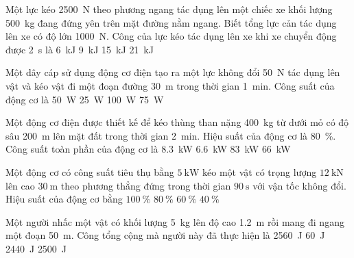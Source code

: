 \begin{ex}
	Một lực kéo \SI{2500}{\newton} theo phương ngang tác dụng lên một chiếc xe khối lượng \SI{500}{\kilogram} đang đứng yên trên mặt đường nằm ngang. Biết tổng lực cản tác dụng lên xe có độ lớn \SI{1000}{\newton}. Công của lực kéo tác dụng lên xe khi xe chuyển động được \SI{2}{\second} là 
	\choice
	{\SI{6}{\kilo\joule}}
	{\SI{9}{\kilo\joule}}
	{\True \SI{15}{\kilo\joule}}
	{\SI{21}{\kilo\joule}}
	\loigiai{}
\end{ex}
\begin{ex}
	Một dây cáp sử dụng động cơ điện tạo ra một lực không đổi \SI{50}{\newton} tác dụng lên vật và kéo vật đi một đoạn đường \SI{30}{\meter} trong thời gian \SI{1}{\minute}. Công suất của động cơ là
	\choice
	{\SI{50}{\watt}}
	{\True \SI{25}{\watt}}
	{\SI{100}{\watt}}
	{\SI{75}{\watt}}
	\loigiai{}
\end{ex}
\begin{ex}
	Một động cơ điện được thiết kế để kéo thùng than nặng \SI{400}{\kilogram} từ dưới mỏ có độ sâu \SI{200}{\meter} lên mặt đất trong thời gian \SI{2}{\minute}. Hiệu suất của động cơ là \SI{80}{\percent}. Công suất toàn phần của động cơ là
	\choice
	{\True \SI{8.3}{\kilo\watt}}
	{\SI{6.6}{\kilo\watt}}
	{\SI{83}{\kilo\watt}}
	{\SI{66}{\kilo\watt}}
	\loigiai{}
\end{ex}
\begin{ex}
	Một động cơ có công suất tiêu thụ bằng $\SI{5}{\kilo\watt}$ kéo một vật có trọng lượng $\SI{12}{\kilo\newton}$ lên cao $\SI{30}{\meter}$ theo phương thẳng đứng trong thời gian $\SI{90}{\second}$ với vận tốc không đổi. Hiệu suất của động cơ bằng
	\choice
	{$\SI{100}{\percent}$}
	{\True $\SI{80}{\percent}$}
	{$\SI{60}{\percent}$}
	{$\SI{40}{\percent}$}
\end{ex}
\begin{ex}
	Một người nhấc một vật có khối lượng \SI{5}{\kilogram} lên độ cao \SI{1.2}{\meter} rồi mang đi ngang một đoạn \SI{50}{\meter}. Công tổng cộng mà người này đã thực hiện là
	\choice
	{\SI{2560}{\joule}}
	{\True \SI{60}{\joule}}
	{\SI{2440}{\joule}}
	{\SI{2500}{\joule}}
	\loigiai{}
\end{ex}
